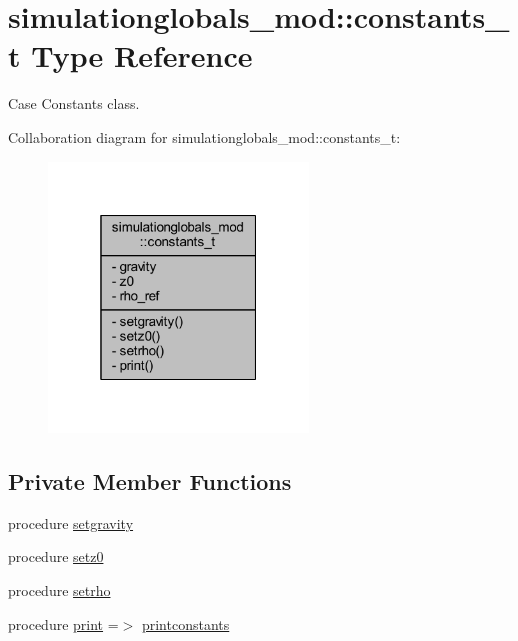 \hypertarget{structsimulationglobals__mod_1_1constants__t}{}\section{simulationglobals\+\_\+mod\+:\+:constants\+\_\+t Type Reference}
\label{structsimulationglobals__mod_1_1constants__t}


Case Constants class.  




Collaboration diagram for simulationglobals\+\_\+mod\+:\+:constants\+\_\+t\+:\nopagebreak
\begin{figure}[H]
\begin{center}
\leavevmode
\includegraphics[width=196pt]{structsimulationglobals__mod_1_1constants__t__coll__graph}
\end{center}
\end{figure}
\subsection*{Private Member Functions}
\begin{DoxyCompactItemize}
\item 
procedure \mbox{\hyperlink{structsimulationglobals__mod_1_1constants__t_aac39b1720d2d3f9a7497c69f83694c9a}{setgravity}}
\item 
procedure \mbox{\hyperlink{structsimulationglobals__mod_1_1constants__t_a6517422a0987640f0574bcce3c6566f1}{setz0}}
\item 
procedure \mbox{\hyperlink{structsimulationglobals__mod_1_1constants__t_a8c3a9d4776bce5b6e7ae475bd7711f0b}{setrho}}
\item 
procedure \mbox{\hyperlink{structsimulationglobals__mod_1_1constants__t_a287a252cb5c736b4da24d79cf9c59897}{print}} =$>$ \mbox{\hyperlink{namespacesimulationglobals__mod_a139cb36f8366e6aec875c7977235fd68}{printconstants}}
\end{DoxyCompactItemize}
